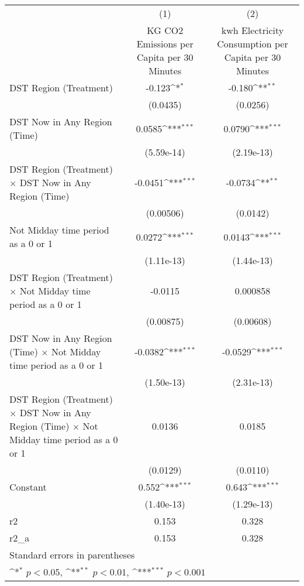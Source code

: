 {
\def\sym#1{\ifmmode^{#1}\else\(^{#1}\)\fi}
\begin{tabular}{l*{2}{c}}
\hline\hline
                    &\multicolumn{1}{c}{(1)}&\multicolumn{1}{c}{(2)}\\
                    &\multicolumn{1}{c}{KG CO2 Emissions per Capita per 30 Minutes}&\multicolumn{1}{c}{kwh Electricity Consumption per Capita per 30 Minutes}\\
\hline
DST Region (Treatment)&      -0.123\sym{*}  &      -0.180\sym{**} \\
                    &    (0.0435)         &    (0.0256)         \\
[1em]
DST Now in Any Region (Time)&      0.0585\sym{***}&      0.0790\sym{***}\\
                    &  (5.59e-14)         &  (2.19e-13)         \\
[1em]
DST Region (Treatment) $\times$ DST Now in Any Region (Time)&     -0.0451\sym{***}&     -0.0734\sym{**} \\
                    &   (0.00506)         &    (0.0142)         \\
[1em]
Not Midday time period as a 0 or 1&      0.0272\sym{***}&      0.0143\sym{***}\\
                    &  (1.11e-13)         &  (1.44e-13)         \\
[1em]
DST Region (Treatment) $\times$ Not Midday time period as a 0 or 1&     -0.0115         &    0.000858         \\
                    &   (0.00875)         &   (0.00608)         \\
[1em]
DST Now in Any Region (Time) $\times$ Not Midday time period as a 0 or 1&     -0.0382\sym{***}&     -0.0529\sym{***}\\
                    &  (1.50e-13)         &  (2.31e-13)         \\
[1em]
DST Region (Treatment) $\times$ DST Now in Any Region (Time) $\times$ Not Midday time period as a 0 or 1&      0.0136         &      0.0185         \\
                    &    (0.0129)         &    (0.0110)         \\
[1em]
Constant            &       0.552\sym{***}&       0.643\sym{***}\\
                    &  (1.40e-13)         &  (1.29e-13)         \\
\hline
r2                  &       0.153         &       0.328         \\
r2\_a                &       0.153         &       0.328         \\
\hline\hline
\multicolumn{3}{l}{\footnotesize Standard errors in parentheses}\\
\multicolumn{3}{l}{\footnotesize \sym{*} \(p<0.05\), \sym{**} \(p<0.01\), \sym{***} \(p<0.001\)}\\
\end{tabular}
}
